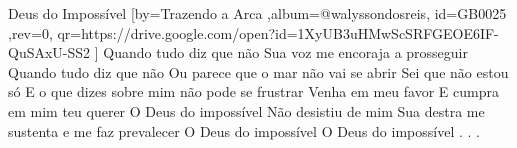 \beginsong
{Deus do Impossível %
}[by={Trazendo a Arca %
},album={@walyssondosreis},
id={GB0025 %
},rev={0}, %
qr={https://drive.google.com/open?id=1XyUB3uHMwScSRFGEOE6IF-QuSAxU-SS2 %
}]
\beginverse*
Quando tudo diz que não
Sua voz me encoraja a prosseguir
Quando tudo diz que não
Ou parece que o mar não vai se abrir
Sei que não estou só
E o que dizes sobre mim não pode se frustrar
Venha em meu favor
E cumpra em mim teu querer
\endverse
\beginchorus
O Deus do impossível
Não desistiu de mim
Sua destra me sustenta e me faz prevalecer
O Deus do impossível
O Deus do impossível
\endchorus
\beginverse*\color{white}
.
.
.
\endverse

\begin{comment}
\lstset{basicstyle=\scriptsize\bf} %
\tab{Solo 1}
\begin{lstlisting}
E|-----------------------------------------------------|
B|-----------------------------------------------------|
G|-----------------------------------------------------|
D|-----------------------------------------------------|
A|-----------------------------------------------------|
E|-----------------------------------------------------|
\end{lstlisting}
\end{comment}
 
